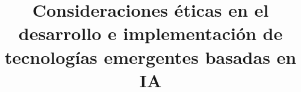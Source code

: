 \documentclass{layout/epfl-report}
\begin{document}
\frontmatter

\title{Consideraciones éticas en el desarrollo e implementación de tecnologías emergentes basadas en IA}

\subject{Grupo de Estudio: Ética en Tecnologías Emergentes Basadas en AI} %


\makecover


%


\tableofcontents




\mainmatter


 

%
%
%
%
%
%
%
%
%


%

\setcounter{biburlnumpenalty}{7000}
\setcounter{biburllcpenalty}{7000}
\setcounter{biburlucpenalty}{7000}



\appendix



\end{document}
